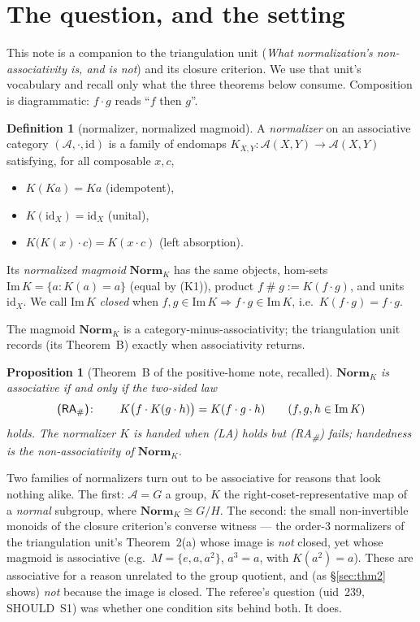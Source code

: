 \documentclass[11pt]{amsart}
\theoremstyle{plain}
\newtheorem{proposition}[theorem]{Proposition}
\theoremstyle{definition}
\newtheorem{definition}[theorem]{Definition}
\theoremstyle{remark}
\newcommand{\Norm}{\mathbf{Norm}}
\newcommand{\Img}{\mathrm{Im}\,}
\newcommand{\id}{\mathrm{id}}
\newcommand{\sh}{\mathbin{\#}}
\newcommand{\LA}{\textsf{(LA)}}
\newcommand{\RA}{\textsf{(RA}\textsubscript{\#}\textsf{)}}
\begin{document}
\section{The question, and the setting}
\label{sec:setup}

This note is a companion to the triangulation unit (\emph{What normalization's non-associativity is,
and is not}) and its closure criterion. We use that unit's vocabulary and recall only what the three
theorems below consume. Composition is diagrammatic: $f\cdot g$ reads ``$f$ then $g$''.

\begin{definition}[normalizer, normalized magmoid]
\label{def:normalizer}
A \emph{normalizer} on an associative category $(\mathcal{A},\cdot,\id)$ is a family of endomaps
$K_{X,Y}\colon\mathcal{A}(X,Y)\to\mathcal{A}(X,Y)$ satisfying, for all composable $x,c$,
\begin{itemize}
  \item[\textsf{(K1)}] $K(K a)=K a$ \quad(idempotent),
  \item[\textsf{(U)}] $K(\id_X)=\id_X$ \quad(unital),
  \item[\LA{}] $K\big(K(x)\cdot c\big)=K(x\cdot c)$ \quad(left absorption).
\end{itemize}
Its \emph{normalized magmoid} $\Norm_K$ has the same objects, hom-sets $\Img K=\{a:K(a)=a\}$ (equal
by \textsf{(K1)}), product $f\sh g:=K(f\cdot g)$, and units $\id_X$. We call $\Img K$ \emph{closed}
when $f,g\in\Img K\Rightarrow f\cdot g\in\Img K$, i.e.\ $K(f\cdot g)=f\cdot g$.
\end{definition}

The magmoid $\Norm_K$ is a category-minus-associativity; the triangulation unit records (its
Theorem~B) exactly when associativity returns.

\begin{proposition}[Theorem~B of the positive-home note, recalled]
\label{prop:thmB}
$\Norm_K$ is associative if and only if the two-sided law
\[
  \RA{}\colon\qquad K\big(f\cdot K(g\cdot h)\big)=K(f\cdot g\cdot h)\qquad(f,g,h\in\Img K)
\]
holds. The normalizer $K$ is \emph{handed} when \LA{} holds but \RA{} fails; handedness is the
non-associativity of $\Norm_K$.
\end{proposition}

Two families of normalizers turn out to be associative for reasons that look nothing alike. The
first: $\mathcal{A}=G$ a group, $K$ the right-coset-representative map of a \emph{normal} subgroup,
where $\Norm_K\cong G/H$. The second: the small non-invertible monoids of the closure criterion's
converse witness --- the order-$3$ normalizers of the triangulation unit's Theorem~2(a) whose image
is \emph{not} closed, yet whose magmoid is associative (e.g.\ $M=\{e,a,a^2\}$, $a^3=a$, with
$K(a^2)=a$). These are associative for a reason unrelated to the group quotient, and (as
§\ref{sec:thm2} shows) \emph{not} because the image is closed. The referee's question (uid~239,
SHOULD~S1) was whether one condition sits behind both. It does.
\end{document}

